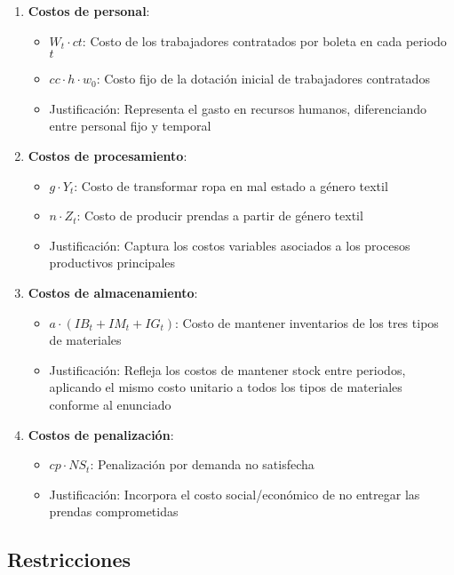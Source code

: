 \begin{enumerate}
    \item \textbf{Costos de personal}:
    \begin{itemize}
        \item $W_t \cdot ct$: Costo de los trabajadores contratados por boleta en cada periodo $t$
        \item $cc \cdot h \cdot w_0$: Costo fijo de la dotación inicial de trabajadores contratados
        \item Justificación: Representa el gasto en recursos humanos, diferenciando entre personal fijo y temporal
    \end{itemize}

    \item \textbf{Costos de procesamiento}:
    \begin{itemize}
        \item $g \cdot Y_t$: Costo de transformar ropa en mal estado a género textil
        \item $n \cdot Z_t$: Costo de producir prendas a partir de género textil
        \item Justificación: Captura los costos variables asociados a los procesos productivos principales
    \end{itemize}

    \item \textbf{Costos de almacenamiento}:
    \begin{itemize}
        \item $a \cdot (IB_t + IM_t + IG_t)$: Costo de mantener inventarios de los tres tipos de materiales
        \item Justificación: Refleja los costos de mantener stock entre periodos, aplicando el mismo costo unitario a todos los tipos de materiales conforme al enunciado
    \end{itemize}

    \item \textbf{Costos de penalización}:
    \begin{itemize}
        \item $cp \cdot NS_t$: Penalización por demanda no satisfecha
        \item Justificación: Incorpora el costo social/económico de no entregar las prendas comprometidas
    \end{itemize}
\end{enumerate}

\subsection*{Restricciones}

